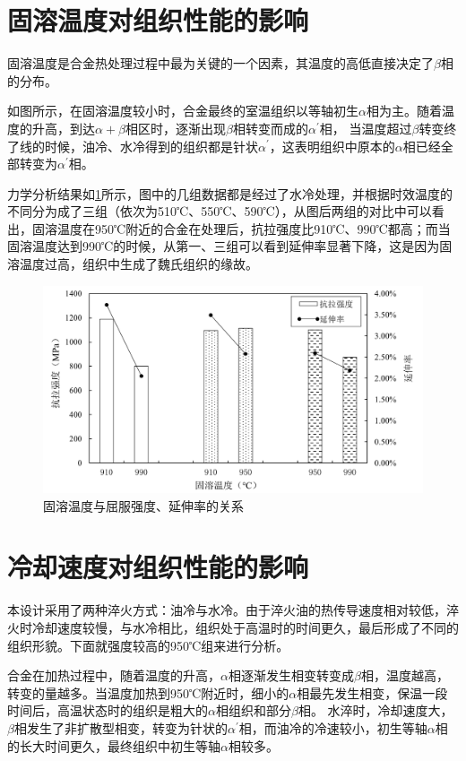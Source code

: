 \section{固溶温度对组织性能的影响}
固溶温度是\ti 合金热处理过程中最为关键的一个因素，其温度的高低直接决定了$\beta$相的分布。

如图所示，在固溶温度较小时，合金最终的室温组织以等轴初生$\alpha$相为主。随着温度的升高，到达$\alpha+\beta$相区时，逐渐出现$\beta$相转变而成的$\alpha^\prime$相，%
当温度超过$\beta $转变终了线的时候，油冷、水冷得到的组织都是针状$\alpha^\prime$，这表明组织中原本的$\alpha$相已经全部转变为$\alpha^\prime$相。

力学分析结果如\ref{fig:Gqy}所示，图中的几组数据都是经过了水冷处理，并根据时效温度的不同分为成了三组（依次为510℃、550℃、590℃），从图后两组的对比中可以看出，固溶温度在950℃附近的合金在处理后，抗拉强度比910℃、990℃都高；而当固溶温度达到990℃的时候，从第一、三组可以看到延伸率显著下降，这是因为固溶温度过高，组织中生成了魏氏组织的缘故。


\begin{figure}[h!]
	\centering
	\includegraphics[width=1\linewidth]{pic/固溶温度与屈服强度、延伸率的关系}
	\caption{固溶温度与屈服强度、延伸率的关系}
	\label{fig:Gqy}
\end{figure}

\section{冷却速度对组织性能的影响}
本设计采用了两种淬火方式：油冷与水冷。由于淬火油的热传导速度相对较低，淬火时冷却速度较慢，与水冷相比，组织处于高温时的时间更久，最后形成了不同的组织形貌。下面就强度较高的950℃组来进行分析。

合金在加热过程中，随着温度的升高，$\alpha$相逐渐发生相变转变成$\beta$相，温度越高，转变的量越多。当温度加热到950℃附近时，细小的$\alpha$相最先发生相变，保温一段时间后，高温状态时的组织是粗大的$\alpha$相组织和部分$\beta$相。
水淬时，冷却速度大，$\beta$相发生了非扩散型相变，转变为针状的$\alpha^\prime$相，而油冷的冷速较小，初生等轴$\alpha$相的长大时间更久，最终组织中初生等轴$\alpha$相较多。


